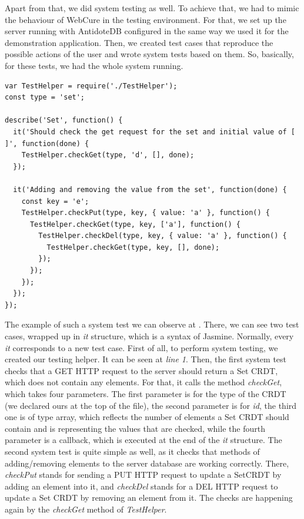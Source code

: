 Apart from that, we did system testing as well. To achieve that, we had to mimic the behaviour of WebCure in the testing environment. For that, we set up the server running with AntidoteDB configured in the same way we used it for the demonstration application. Then, we created test cases that reproduce the possible actions of the user and wrote system tests based on them. So, basically, for these tests, we had the whole system running. 

\begin{lstlisting}[caption={[System test example for WebCure] Simple system test that checks different actions performed on \textit{SetCRDT}.}, label={lst:ev2}]
var TestHelper = require('./TestHelper');
const type = 'set';

describe('Set', function() {
  it('Should check the get request for the set and initial value of [ ]', function(done) {
    TestHelper.checkGet(type, 'd', [], done);
  });

  it('Adding and removing the value from the set', function(done) {
    const key = 'e';
    TestHelper.checkPut(type, key, { value: 'a' }, function() {
      TestHelper.checkGet(type, key, ['a'], function() {
        TestHelper.checkDel(type, key, { value: 'a' }, function() {
          TestHelper.checkGet(type, key, [], done);
        });
      });
    });
  });
});
\end{lstlisting}

The example of such a system test we can observe at . There, we can see two test cases, wrapped up in \textit{it} structure, which is a syntax of Jasmine. Normally, every \textit{it} corresponds to a new test case. First of all, to perform system testing, we created our testing helper. It can be seen at \textit{line 1}. Then, the first system test checks that a GET HTTP request to the server should return a Set CRDT, which does not contain any elements. For that, it calls the method \textit{checkGet}, which takes four parameters. The first parameter is for the type of the CRDT (we declared ours at the top of the file), the second parameter is for \textit{id}, the third one is of type array, which reflects the number of elements a Set CRDT should contain and is representing the values that are checked, while the fourth parameter is a callback, which is executed at the end of the \textit{it} structure. The second system test is quite simple as well, as it checks that methods of adding/removing elements to the server database are working correctly. There, \textit{checkPut} stands for sending a PUT HTTP request to update a SetCRDT by adding an element into it, and \textit{checkDel} stands for a DEL HTTP request to update a Set CRDT by removing an element from it. The checks are happening again by the \textit{checkGet} method of \textit{TestHelper}.

